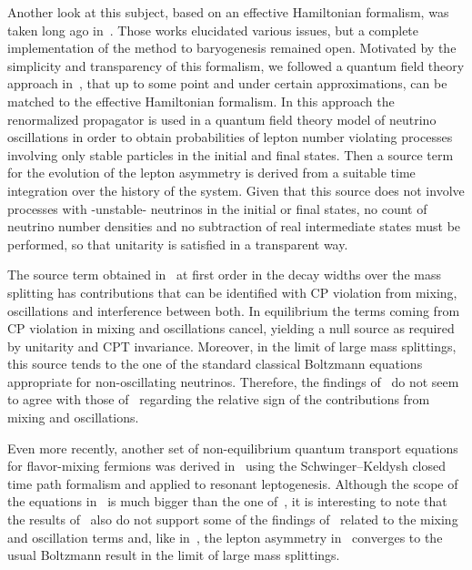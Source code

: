 \documentclass[11pt,a4paper]{article}
\begin{document}
Another look at this subject, based on an effective Hamiltonian formalism, was taken long ago in~\cite{Liu:1993ds, covi96II}. Those works elucidated various issues, but a complete implementation of the method to baryogenesis remained open. Motivated by the  simplicity and transparency of this formalism, we followed a quantum field theory approach in~\cite{Racker20}, that up to some point and under certain approximations, can be matched to the effective Hamiltonian formalism. In this approach the renormalized propagator is used in a quantum field theory model of neutrino oscillations in order to obtain probabilities of lepton number violating processes involving only stable particles in the initial and final states. Then a source term for the evolution of the lepton asymmetry is derived from a suitable time integration over the history of the system. Given that this source does not involve processes with -unstable- neutrinos in the initial or final states, no count of neutrino number densities and no subtraction of real intermediate states must be performed, so that unitarity is satisfied in a transparent way. 

The source term obtained in~\cite{Racker20} at first order in the decay widths over the mass splitting has contributions that can be identified with CP violation from mixing, oscillations and interference between both. In equilibrium the terms coming from CP violation in mixing and oscillations cancel, yielding a null source as required by unitarity and CPT invariance. Moreover, in the limit of large mass splittings, this source tends to the one of the standard classical Boltzmann equations appropriate for non-oscillating neutrinos. Therefore, the findings of~\cite{Racker20} do not seem to agree with those of~\cite{Dev:2014laa, Dev:2015wpa, Dev:2014wsa, Kartavtsev15}
regarding the relative sign of the contributions from mixing and oscillations.  

Even more recently, another set of non-equilibrium quantum transport equations for flavor-mixing fermions was derived in~\cite{Jukkala:2021cys} using the Schwinger–Keldysh closed time path formalism and applied to resonant leptogenesis. Although the scope of the equations in~\cite{Jukkala:2021cys} is much bigger than the one of~\cite{Racker20}, it is interesting to note that the results of~\cite{Jukkala:2021cys} also do not support some of the findings of~\cite{Dev:2014laa, Dev:2015wpa, Dev:2014wsa, Kartavtsev15} related to the mixing and oscillation terms and, like in~\cite{Racker20}, the lepton asymmetry in~\cite{Jukkala:2021cys} converges to the usual Boltzmann result in the limit of large mass splittings. 
 
\end{document}
